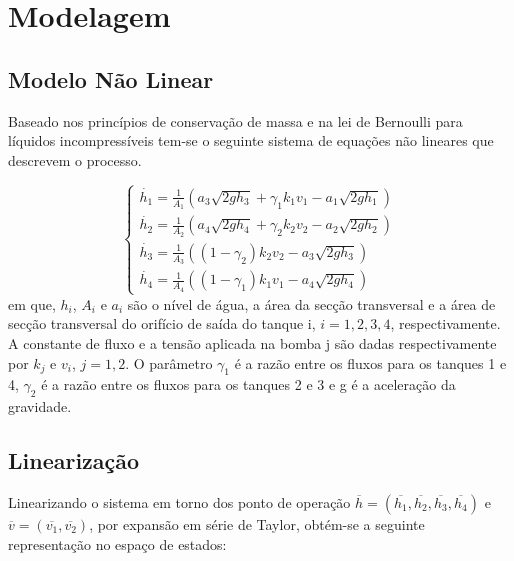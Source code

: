 %

\chapter{Modelagem}

\section{Modelo Não Linear}
Baseado nos princípios de conservação de massa e na lei de Bernoulli para líquidos incompressíveis tem-se o seguinte sistema de equações não lineares que descrevem o processo.

\begin{equation}
	\begin{cases}
		\dot{h_{1}} = \frac{1}{A_{1}}(a_{3}\sqrt{2gh_{3}} + \gamma_{1}k_{1}v_{1} - a_{1}\sqrt{2gh_{1}})\\
		
		\dot{h_{2}} = \frac{1}{A_{2}}(a_{4}\sqrt{2gh_{4}} + \gamma_{2}k_{2}v_{2} - a_{2}\sqrt{2gh_{2}})\\
		
		\dot{h_{3}} = \frac{1}{A_{3}}((1 - \gamma_{2})k_{2}v_{2} - a_{3}\sqrt{2gh_{3}})\\
		
		\dot{h_{4}} = \frac{1}{A_{4}}((1 - \gamma_{1})k_{1}v_{1} - a_{4}\sqrt{2gh_{4}})
	\end{cases}
\end{equation}
em que, $h_{i}$, $A_{i}$ e $a_{i}$ são o nível de água, a área da secção transversal e a área de secção transversal do orifício de saída do tanque i, $i=1,2,3,4$, respectivamente. A constante de fluxo e a tensão aplicada na bomba j são dadas respectivamente por $k_{j}$ e $v_{i}$, $j=1,2$. O parâmetro $\gamma_{1}$ é a razão entre os fluxos para os tanques 1 e 4, $\gamma_{2}$ é a razão entre os fluxos para os tanques 2 e 3 e g é a aceleração da gravidade. 

\section{Linearização}
Linearizando o sistema em torno dos ponto de operação $\overline{h}=(\overline{h_{1}},\overline{h_{2}},\overline{h_{3}},\overline{h_{4}})$ e $\overline{v}=(\overline{v_{1}},\overline{v_{2}})$, por expansão em série de Taylor, obtém-se a seguinte representação no espaço de estados:


